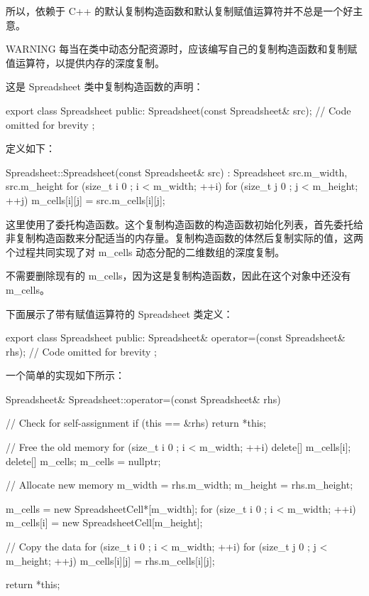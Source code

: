 所以，依赖于 C++ 的默认复制构造函数和默认复制赋值运算符并不总是一个好主意。

\begin{myWarning}{WARNING}
每当在类中动态分配资源时，应该编写自己的复制构造函数和复制赋值运算符，以提供内存的深度复制。
\end{myWarning}


这是 Spreadsheet 类中复制构造函数的声明：

\begin{cpp}
export class Spreadsheet
{
    public:
        Spreadsheet(const Spreadsheet& src);
        // Code omitted for brevity
};
\end{cpp}

定义如下：

\begin{cpp}
Spreadsheet::Spreadsheet(const Spreadsheet& src)
    : Spreadsheet { src.m_width, src.m_height }
{
    for (size_t i { 0 }; i < m_width; ++i) {
        for (size_t j { 0 }; j < m_height; ++j) {
            m_cells[i][j] = src.m_cells[i][j];
        }
    }
}
\end{cpp}

这里使用了委托构造函数。这个复制构造函数的构造函数初始化列表，首先委托给非复制构造函数来分配适当的内存量。复制构造函数的体然后复制实际的值，这两个过程共同实现了对 m\_cells 动态分配的二维数组的深度复制。

不需要删除现有的 m\_cells，因为这是复制构造函数，因此在这个对象中还没有m\_cells。


下面展示了带有赋值运算符的 Spreadsheet 类定义：

\begin{cpp}
export class Spreadsheet
{
    public:
        Spreadsheet& operator=(const Spreadsheet& rhs);
        // Code omitted for brevity
};
\end{cpp}

一个简单的实现如下所示：

\begin{cpp}
Spreadsheet& Spreadsheet::operator=(const Spreadsheet& rhs)
{
    // Check for self-assignment
    if (this == &rhs) {
        return *this;
    }

    // Free the old memory
    for (size_t i { 0 }; i < m_width; ++i) {
        delete[] m_cells[i];
    }
    delete[] m_cells;
    m_cells = nullptr;

    // Allocate new memory
    m_width = rhs.m_width;
    m_height = rhs.m_height;

    m_cells = new SpreadsheetCell*[m_width];
    for (size_t i { 0 }; i < m_width; ++i) {
        m_cells[i] = new SpreadsheetCell[m_height];
    }

    // Copy the data
    for (size_t i { 0 }; i < m_width; ++i) {
        for (size_t j { 0 }; j < m_height; ++j) {
            m_cells[i][j] = rhs.m_cells[i][j];
        }
    }

    return *this;
}
\end{cpp}

